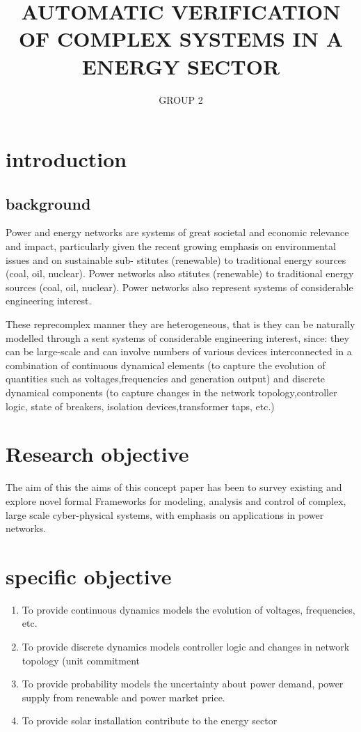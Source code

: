 \documentclass[11pt]{article}
\title{AUTOMATIC VERIFICATION OF COMPLEX SYSTEMS IN A ENERGY SECTOR}
\author{GROUP 2}
\begin{document}
\maketitle

\section{introduction}
\subsection{background}

Power and energy networks are systems of great societal and economic relevance and impact, particularly given the recent growing emphasis on environmental issues and on sustainable sub- stitutes (renewable) to traditional energy sources (coal, oil, nuclear). Power networks also stitutes (renewable) to traditional energy sources (coal, oil, nuclear). Power networks also represent systems of considerable engineering interest.
\space
\newline

These reprecomplex manner they are heterogeneous, that is they can be naturally modelled through a sent systems of considerable engineering interest, since: they can be large-scale and can involve numbers of various devices interconnected in a combination of continuous dynamical elements (to capture the evolution of quantities such as voltages,frequencies and generation output) and discrete dynamical components (to capture changes in the network topology,controller logic, state of breakers, isolation devices,transformer taps, etc.)

\section{Research objective}
The aim of this the aims of this concept paper has been to survey existing and explore novel formal Frameworks for modeling, analysis and control of complex, large scale cyber-physical systems, with emphasis on applications in power networks.
\section{specific objective}
\begin{enumerate}
\item 	To provide continuous dynamics models the evolution of voltages, frequencies, etc.
\item 	To provide discrete dynamics models controller logic and changes in network topology (unit commitment
\item 	To provide probability models the uncertainty about power demand, power supply from renewable and power market price.
\item  To provide solar installation contribute to the energy sector
\end{enumerate}
\end{document}

